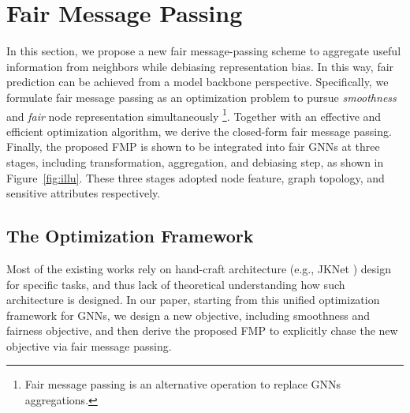 \documentclass[letterpaper]{article} %
\theoremstyle{plain}
\theoremstyle{definition}
\theoremstyle{remark}
\begin{document}
\section{Fair Message Passing}
In this section, we propose a new fair message-passing scheme to aggregate useful information from neighbors while debiasing representation bias. In this way, fair prediction can be achieved from a model backbone perspective. Specifically, we formulate fair message passing as an optimization problem to pursue \emph{smoothness} and \emph{fair} node representation simultaneously \footnote{Fair message passing is an alternative operation to replace GNNs aggregations.}. Together with an effective and efficient optimization algorithm, we derive the closed-form fair message passing. Finally, the proposed FMP is shown to be integrated into fair GNNs at three stages, including transformation, aggregation, and debiasing step, as shown in Figure~\ref{fig:illu}. These three stages adopted node feature, graph topology, and sensitive attributes respectively.

\subsection{The Optimization Framework}
Most of the existing works rely on hand-craft architecture (e.g., JKNet \citep{xu2018representation}) design for specific tasks, and thus lack of theoretical understanding how such architecture is designed. In our paper, starting from this unified optimization framework for GNNs, we design a new objective, including smoothness and fairness objective, and then derive the proposed FMP to explicitly chase the new objective via fair message passing.
\end{document}
